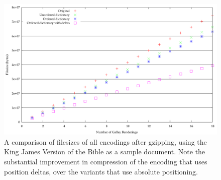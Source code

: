 \begin{figure}
  \begin{center}
  \includegraphics[height=\textwidth,angle=90]{gnuplot/kjv-gz}
  \end{center}
  \caption[Comparison of gzips of all encodings]{A comparison of filesizes of all encodings after gzipping, using the King James Version of the Bible as a sample document. Note the substantial improvement in compression of the encoding that uses position deltas, over the variants that use absolute positioning.}
  \label{fig:size-all-gz}
\end{figure}




